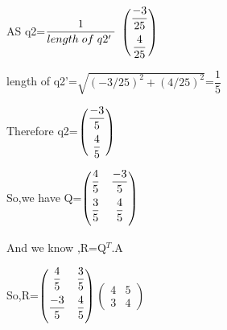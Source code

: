 \documentclass[a4paper,12pt]{article}
\begin{document}
AS  q2=$\dfrac{1}{length \hspace{1mm} of \hspace{1mm} q2'\hspace{1mm} }$
$\begin{pmatrix} \dfrac{-3}{25} \vspace*{2mm} \\ \dfrac{4}{25} \end{pmatrix}$ \\
\vspace{0.5cm}

length of q2'=$\sqrt{(-3/25)^2+(4/25)^2}$=$\dfrac{1}{5}$\\

\vspace{0.5cm}

Therefore q2=$\begin{pmatrix} \dfrac{-3}{5} \vspace*{2mm} \\ \dfrac{4}{5} \end{pmatrix}$ \\

\vspace{0.5cm}

So,we have Q=$\begin{pmatrix} \dfrac{4}{5} \vspace*{2mm} & \dfrac{-3}{5} \\ \dfrac{3}{5} \vspace*{2mm} & \dfrac{4}{5} \end{pmatrix}$\\

\vspace{0.5cm}

And we know ,R=Q$^T$.A\\

\vspace{0.5cm}

So,R=$\begin{pmatrix} \dfrac{4}{5} \vspace*{2mm} & \dfrac{3}{5} \\ \dfrac{-3}{5} \vspace*{2mm} & \dfrac{4}{5} \end{pmatrix}${\LARGE  $\begin{pmatrix} 4 & 5  \\ 3 & 4 \end{pmatrix}$}\\

\vspace{0.5cm}
\end{document}
